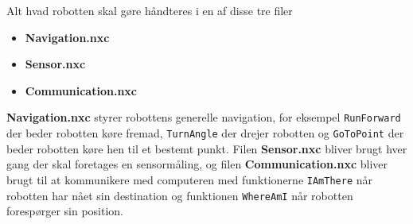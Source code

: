 Alt hvad robotten skal gøre håndteres i en af disse tre filer

\begin{itemize}
\item \textbf{Navigation.nxc}
\item \textbf{Sensor.nxc}
\item \textbf{Communication.nxc}
\end{itemize}

\textbf{Navigation.nxc} styrer robottens generelle navigation, for eksempel \lstinline[style=c]!RunForward! der beder robotten køre fremad, \lstinline[style=c]!TurnAngle! der drejer robotten og \lstinline[style=c]!GoToPoint! der beder robotten køre hen til et bestemt punkt.
Filen \textbf{Sensor.nxc} bliver brugt hver gang der skal foretages en sensormåling, og filen \textbf{Communication.nxc} bliver brugt til at kommunikere med computeren med funktionerne \lstinline[style=c]!IAmThere! når robotten har nået sin destination og funktionen \lstinline[style=c]!WhereAmI! når robotten forespørger sin position.
